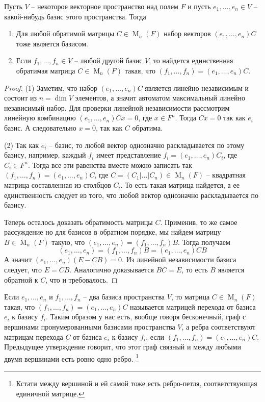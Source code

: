 \begin{claim}
\label{claim::BasisClassification}
Пусть $V$ -- некоторое векторное пространство над полем $F$ и пусть $e_1,\ldots, e_n\in V$ -- какой-нибудь базис этого пространства.
Тогда
\begin{enumerate}
\item Для любой обратимой матрицы $C\in \operatorname{M}_{n}(F)$ набор векторов $(e_1,\ldots,e_n)C$ тоже является базисом.

\item Если $f_1,\ldots,f_n\in V$ -- любой другой базис $V$, то найдется единственная обратимая матрица $C\in\operatorname{M}_n(F)$ такая, что $(f_1,\ldots,f_n) = (e_1,\ldots,e_n)C$.
\end{enumerate}
\end{claim}
\begin{proof}
(1) Заметим, что набор $(e_1,\ldots,e_n)C$ является линейно независимым и состоит из $n = \dim V$ элементов, а значит автоматом максимальный линейно независимый набор.
Для проверки линейной независимости рассмотрим линейную комбинацию $(e_1,\ldots,e_n)Cx = 0$, где $x\in F^n$.
Тогда $Cx = 0$ так как $e_i$ базис.
А следовательно $x = 0$, так как $C$ обратима.

(2) Так как $e_i$ -- базис, то любой вектор однозначно раскладывается по этому базису, например, каждый $f_i$ имеет представление $f_i = (e_1,\ldots, e_n) C_i$, где $C_i\in F^n$.
Тогда все эти равенства вместе можно записать так $(f_1,\ldots,f_n) = (e_1,\ldots,e_n) C$, где $C = (C_1|\ldots|C_n)\in \operatorname{M}_n (F)$ -- квадратная матрица составленная из столбцов $C_i$.
То есть такая матрица найдется, а ее единственность следует из того, что любой вектор однозначно раскладывается по базису.

Теперь осталось доказать обратимость матрицы $C$.
Применив, то же самое рассуждение но для базисов в обратном порядке, мы найдем матрицу $B\in \operatorname{M}_n(F)$ такую, что $(e_1,\ldots,e_n) = (f_1,\ldots,f_n) B$.
Тогда получаем 
\[
(e_1,\ldots,e_n) = (f_1,\ldots,f_n)B = (e_1,\ldots,e_n)CB
\]
А значит $(e_1,\ldots, e_n)(E - CB) = 0$.
Из линейной независимости базиса следует, что $E = CB$.
Аналогично доказывается $BC = E$, то есть $B$ является обратной к $C$, что и требовалось.
\end{proof}


Если $e_1,\ldots,e_n$ и $f_1,\ldots,f_n$ -- два базиса пространства $V$, то матрица $C\in \operatorname{M}_n(F)$ такая, что $(f_1,\ldots, f_n) = (e_1,\ldots,e_n)C$ называется матрицей перехода от базиса $e_i$ к базису $f_i$.
Таким образом у нас есть, вообще говоря бесконечный, граф с вершинами пронумерованными базисами пространства $V$, а ребра соответствуют матрицам перехода $C$ от базиса $e_i$ к базису $f_i$, если $(f_1,\ldots,f_n) = (e_1,\ldots,e_n)C$.
Предыдущее утверждение говорит, что этот граф связный и между любыми двумя вершинами есть ровно одно ребро.%
\footnote{Кстати между вершиной и ей самой тоже есть ребро-петля, соответствующая единичной матрице.}

